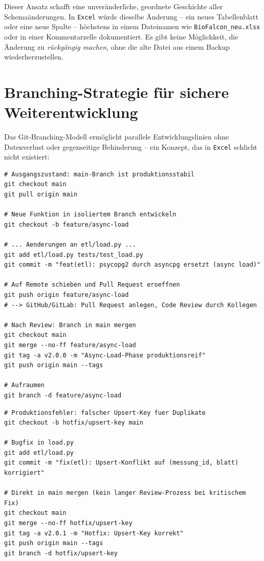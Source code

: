﻿\documentclass[12pt,a4paper]{report}
\theoremstyle{definition}
\theoremstyle{remark}
\newcommand{\excel}{\texttt{Excel}}
\newcommand{\code}[1]{\texttt{#1}}
\begin{document}
Dieser Ansatz schafft eine unveränderliche, geordnete Geschichte aller
Schemaänderungen. In \excel{} würde dieselbe Änderung -- ein neues
Tabellenblatt oder eine neue Spalte -- höchstens in einem
Dateinamen wie \code{BioFalcon\_neu.xlsx} oder in einer
Kommentarzelle dokumentiert. Es gibt keine Möglichkeit,
die Änderung zu \emph{rückgängig machen}, ohne die alte Datei
aus einem Backup wiederherzustellen.

\section{Branching-Strategie für sichere Weiterentwicklung}

Das Git-Branching-Modell ermöglicht parallele Entwicklungslinien ohne
Datenverlust oder gegenseitige Behinderung -- ein Konzept, das in
\excel{} schlicht nicht existiert:

\begin{lstlisting}[style=bash, caption={Feature-Branch-Workflow (GitHub Flow)}]
# Ausgangszustand: main-Branch ist produktionsstabil
git checkout main
git pull origin main

# Neue Funktion in isoliertem Branch entwickeln
git checkout -b feature/async-load

# ... Aenderungen an etl/load.py ...
git add etl/load.py tests/test_load.py
git commit -m "feat(etl): psycopg2 durch asyncpg ersetzt (async load)"

# Auf Remote schieben und Pull Request eroeffnen
git push origin feature/async-load
# --> GitHub/GitLab: Pull Request anlegen, Code Review durch Kollegen

# Nach Review: Branch in main mergen
git checkout main
git merge --no-ff feature/async-load
git tag -a v2.0.0 -m "Async-Load-Phase produktionsreif"
git push origin main --tags

# Aufraumen
git branch -d feature/async-load
\end{lstlisting}

\begin{lstlisting}[style=bash, caption={Hotfix: Kritischen Bug in Produktion beheben}]
# Produktionsfehler: falscher Upsert-Key fuer Duplikate
git checkout -b hotfix/upsert-key main

# Bugfix in load.py
git add etl/load.py
git commit -m "fix(etl): Upsert-Konflikt auf (messung_id, blatt) korrigiert"

# Direkt in main mergen (kein langer Review-Prozess bei kritischem Fix)
git checkout main
git merge --no-ff hotfix/upsert-key
git tag -a v2.0.1 -m "Hotfix: Upsert-Key korrekt"
git push origin main --tags
git branch -d hotfix/upsert-key
\end{lstlisting}
\end{document}
